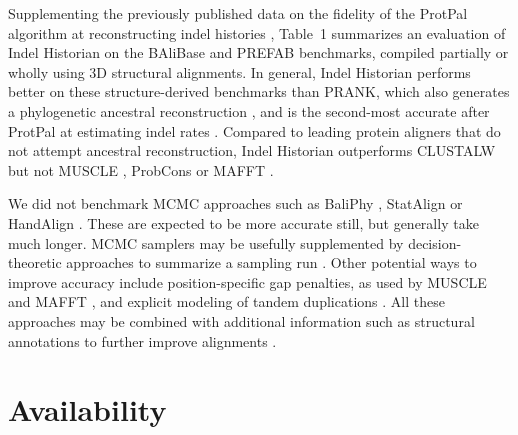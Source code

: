 \documentclass{bioinfo}
\begin{document}
Supplementing the previously published data on the fidelity of the ProtPal algorithm
at reconstructing indel histories \citep{Westesson2012-zg},
Table~1 summarizes an evaluation of Indel Historian
on the BAliBase and PREFAB benchmarks,
compiled partially or wholly using 3D structural alignments.
In general, Indel Historian performs better on these structure-derived benchmarks than PRANK,
which also generates a phylogenetic ancestral reconstruction \citep{LoytynojaGoldman2008},
and is the second-most accurate after ProtPal at estimating indel rates \citep{Westesson2012-zg}.
Compared to leading protein aligners that do not attempt ancestral reconstruction,
Indel Historian outperforms CLUSTALW \citep{LarkinEtAl2007} but not MUSCLE \citep{Edgar2004b},
ProbCons \citep{DoEtAl2005} or MAFFT \citep{KatohEtAl2005}.

We did not benchmark MCMC approaches
such as BaliPhy \citep{Redelings2014}, StatAlign \citep{NovakEtAl2008} or HandAlign \citep{WestessonBarquistHolmes2012}.
These are expected to be more accurate still, but generally take much longer.
MCMC samplers may be usefully supplemented by decision-theoretic approaches to summarize a sampling run \citep{HermanEtAl2015}.
Other potential ways to improve accuracy include position-specific gap penalties, as used by MUSCLE \citep{Edgar2004b} and MAFFT \citep{KatohEtAl2005},
and explicit modeling of tandem duplications \citep{SzalkowskiAnisimova2013}.
All these approaches may be combined with additional information such as structural annotations to further improve alignments \citep{HermanEtAl2014}.

% 
% 
% 



\section{Availability}
\end{document}

